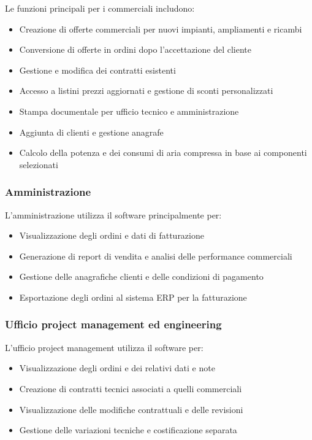 \documentclass[12pt, a4paper]{article}
\begin{document}
Le funzioni principali per i commerciali includono:
\begin{itemize}
      \item Creazione di offerte commerciali per nuovi impianti, ampliamenti e ricambi
      \item Conversione di offerte in ordini dopo l'accettazione del cliente
      \item Gestione e modifica dei contratti esistenti
      \item Accesso a listini prezzi aggiornati e gestione di sconti personalizzati
      \item Stampa documentale per ufficio tecnico e amministrazione
      \item Aggiunta di clienti e gestione anagrafe
      \item Calcolo della potenza e dei consumi di aria compressa in base ai componenti selezionati
\end{itemize}

\subsubsection{Amministrazione}

L'amministrazione utilizza il software principalmente per:
\begin{itemize}
      \item Visualizzazione degli ordini e dati di fatturazione
      \item Generazione di report di vendita e analisi delle performance commerciali
      \item Gestione delle anagrafiche clienti e delle condizioni di pagamento
      \item Esportazione degli ordini al sistema ERP per la fatturazione
\end{itemize}

\subsubsection{Ufficio project management ed engineering}

L'ufficio project management utilizza il software per:
\begin{itemize}
      \item Visualizzazione degli ordini e dei relativi dati e note
      \item Creazione di contratti tecnici associati a quelli commerciali
      \item Visualizzazione delle modifiche contrattuali e delle revisioni
      \item Gestione delle variazioni tecniche e costificazione separata
\end{itemize}
\end{document}
